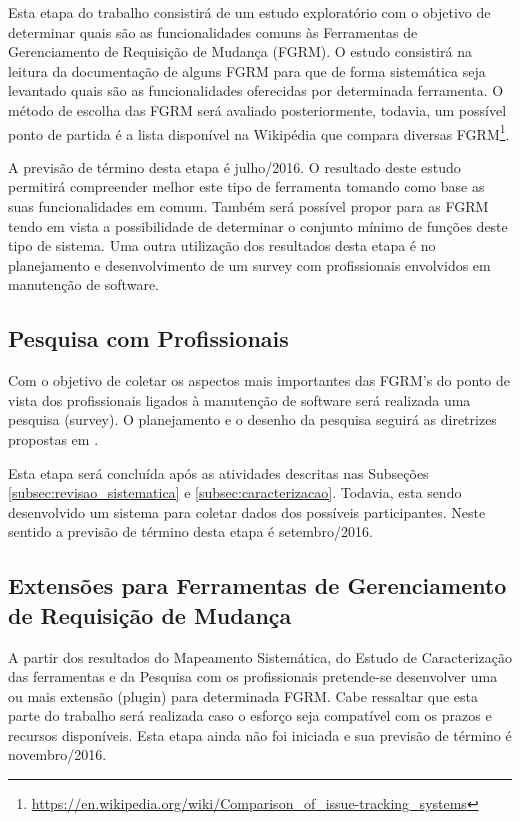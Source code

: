 \documentclass[10pt,a4paper]{report}
\begin{document}
Esta etapa do trabalho consistirá de um estudo exploratório com o objetivo de determinar quais são as funcionalidades comuns às Ferramentas de Gerenciamento de Requisição de Mudança (FGRM). O estudo consistirá na leitura da documentação de alguns FGRM para que de forma sistemática seja levantado quais são as funcionalidades oferecidas por determinada ferramenta. O método de escolha das FGRM será avaliado posteriormente, todavia, um possível ponto de partida é a lista disponível na Wikipédia que compara diversas FGRM\footnote{\url{https://en.wikipedia.org/wiki/Comparison_of_issue-tracking_systems}}.

A previsão de término desta etapa é julho/2016. O resultado deste estudo permitirá compreender melhor este tipo de ferramenta tomando como base as suas funcionalidades em comum. Também será possível propor  para as FGRM tendo em vista a possibilidade de determinar o conjunto mínimo de funções deste tipo de sistema. Uma outra utilização dos resultados desta etapa é no planejamento e desenvolvimento de um survey com profissionais envolvidos em manutenção de software.

\subsection{Pesquisa com Profissionais}
\label{subsec:survey}
Com o objetivo de coletar os aspectos mais importantes das FGRM's do ponto de
vista dos profissionais ligados à manutenção de software será realizada uma
pesquisa (survey). O planejamento e o desenho da pesquisa seguirá as diretrizes propostas em \cite{wohlin2012experimentation}.

Esta etapa será concluída após as atividades descritas nas Subseções \ref{subsec:revisao_sistematica} e \ref{subsec:caracterizacao}. Todavia, esta sendo desenvolvido um sistema para coletar dados dos possíveis participantes. Neste sentido a previsão de término desta etapa é setembro/2016.

\subsection{Extensões para Ferramentas de Gerenciamento de Requisição de Mudança}
\label{subsec:novas-extensoes}

A partir dos resultados do Mapeamento Sistemática, do Estudo de Caracterização das ferramentas e da Pesquisa com os profissionais pretende-se desenvolver uma ou mais extensão (plugin) para determinada FGRM. Cabe ressaltar que esta parte do trabalho será realizada caso o esforço seja compatível com os prazos e recursos disponíveis. Esta etapa ainda não foi iniciada e sua previsão de término é novembro/2016.
\end{document}
